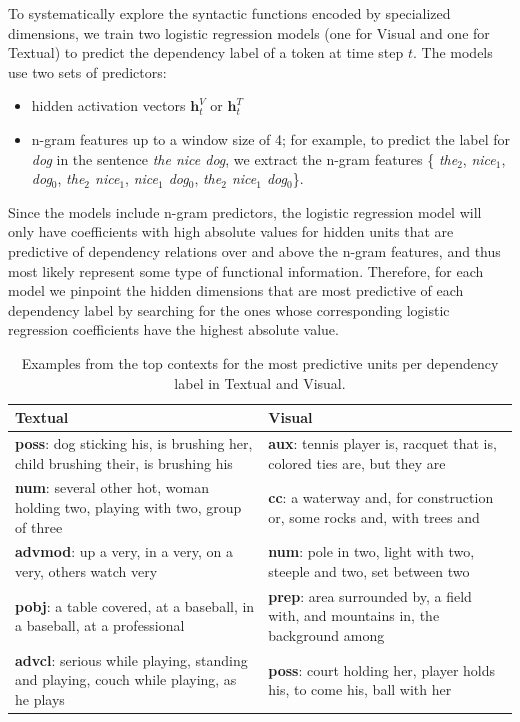 To systematically explore the syntactic functions encoded by 
specialized dimensions, we train two logistic regression models (one for {\sc Visual} 
and one for {\sc Textual}) to predict the dependency label of a token at time
step $t$. The models use two sets of predictors:
\begin{itemize}
  \item hidden activation vectors $\mathbf{h}_t^V$ or $\mathbf{h}_t^T$
  \item n-gram features up to a window size of 4; for example, to predict the label 
  for {\it dog} in the sentence {\it the nice dog}, we extract the n-gram features \{ {\it the}$_2$, {\it nice}$_1$, 
  {\it dog}$_0$, {\it the$_2$ nice$_1$}, {\it nice$_1$ dog$_0$}, {\it the$_2$ nice$_1$ 
  dog$_0$}\}.
\end{itemize}
Since the models include n-gram predictors, the logistic regression model will only
have coefficients with high absolute values for hidden units that are predictive of 
dependency relations over and above the n-gram features, and thus most 
likely represent some type of functional information. Therefore, for each model 
we pinpoint the hidden dimensions that are most predictive of each dependency label by 
searching for the ones whose corresponding logistic regression coefficients 
have the highest absolute value. 

\begin{table}
\small
\caption{Examples from the top contexts for the most predictive units per dependency label in {\sc Textual} and {\sc Visual}.}
\label{tab:syntax}
\begin{center}
    \begin{tabular}{|p{6cm}| p{6cm}|}
    \hline
   {\sc Textual} & {\sc Visual} \\
    \hline
    {\bf poss}:  dog sticking his, is brushing her, child brushing their, is brushing his &
    {\bf aux}: tennis player is, racquet that is, colored ties are, but they are\\
    \hline
    
    {\bf num}: several other hot, woman holding two, playing with two, group of three &
    {\bf cc}: a waterway and, for construction or, some rocks and, with trees and\\
    \hline

    {\bf advmod}:  up a very, in a very, on a very, others watch very &
    {\bf num}: pole in two, light with two, steeple and two, set between two\\
    \hline

   {\bf pobj}: a table covered, at a baseball, in a baseball, at a professional &
   {\bf prep}: area surrounded by, a field with, and mountains in, the background among\\   
       \hline

   {\bf advcl}: serious while playing, standing and playing, couch while playing, as 
he plays &
   {\bf poss}: court holding her, player holds his, to come his, ball with her \\
   
   \hline
    \end{tabular}
\end{center}
\end{table}


